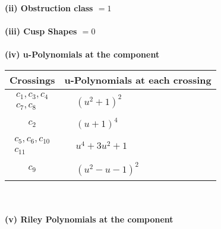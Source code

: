 \documentclass[1p]{elsarticle_modified}
\theoremstyle{definition}
\begin{document}
\flushleft \textbf{(ii) Obstruction class $= 1$}\\~\\
\flushleft \textbf{(iii) Cusp Shapes $= 0$}\\~\\
\newpage\renewcommand{\arraystretch}{1}
\flushleft \textbf{(iv) u-Polynomials at the component}\newline \\
\begin{tabular}{m{50pt}|m{274pt}}
Crossings & \hspace{64pt}u-Polynomials at each crossing \\
\hline $$\begin{aligned}c_{1},c_{3},c_{4}\\c_{7},c_{8}\end{aligned}$$&$\begin{aligned}
&(u^2+1)^2
\end{aligned}$\\
\hline $$\begin{aligned}c_{2}\end{aligned}$$&$\begin{aligned}
&(u+1)^4
\end{aligned}$\\
\hline $$\begin{aligned}c_{5},c_{6},c_{10}\\c_{11}\end{aligned}$$&$\begin{aligned}
&u^4+3 u^2+1
\end{aligned}$\\
\hline $$\begin{aligned}c_{9}\end{aligned}$$&$\begin{aligned}
&(u^2- u-1)^2
\end{aligned}$\\
\hline
\end{tabular}\\~\\
\newpage\renewcommand{\arraystretch}{1}
\flushleft \textbf{(v) Riley Polynomials at the component}\newline \\
\end{document}
